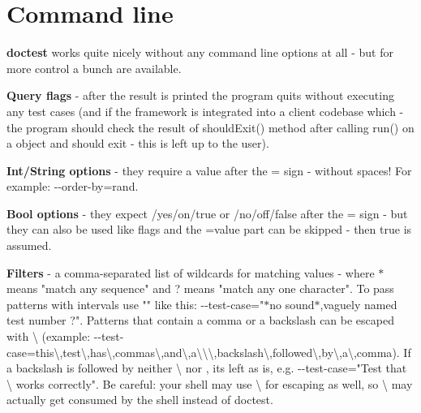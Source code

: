 \chapter{Command line}
\hypertarget{md_doctest_2doc_2markdown_2commandline}{}\label{md_doctest_2doc_2markdown_2commandline}
\label{md_doctest_2doc_2markdown_2commandline_autotoc_md76}%
%


{\bfseries{doctest}} works quite nicely without any command line options at all -\/ but for more control a bunch are available.

{\bfseries{Query flags}} -\/ after the result is printed the program quits without executing any test cases (and if the framework is integrated into a client codebase which  -\/ the program should check the result of {\ttfamily should\+Exit()} method after calling {\ttfamily run()} on a {\ttfamily {}} object and should exit -\/ this is left up to the user).

{\bfseries{Int/\+String options}} -\/ they require a value after the {\ttfamily =} sign -\/ without spaces! For example\+: {\ttfamily -\/-\/order-\/by=rand}.

{\bfseries{Bool options}} -\/ they expect {}/{\ttfamily yes}/{\ttfamily on}/{\ttfamily true} or {}/{\ttfamily no}/{\ttfamily off}/{\ttfamily false} after the {\ttfamily =} sign -\/ but they can also be used like flags and the {\ttfamily =value} part can be skipped -\/ then {\ttfamily true} is assumed. ~\newline


{\bfseries{Filters}} -\/ a comma-\/separated list of wildcards for matching values -\/ where {\ttfamily \texorpdfstring{$\ast$}{*}} means "{}match any sequence"{} and {\ttfamily ?} means "{}match any one character"{}. To pass patterns with intervals use {\ttfamily "{}"{}} like this\+: {\ttfamily -\/-\/test-\/case="{}\texorpdfstring{$\ast$}{*}no sound\texorpdfstring{$\ast$}{*},vaguely named test number ?"{}}. Patterns that contain a comma or a backslash can be escaped with {\ttfamily \textbackslash{}} (example\+: {\ttfamily -\/-\/test-\/case=this\textbackslash{},test\textbackslash{},has\textbackslash{},commas\textbackslash{},and\textbackslash{},a\textbackslash{}\textbackslash{}\textbackslash{},backslash\textbackslash{},followed\textbackslash{},by\textbackslash{},a\textbackslash{},comma}). If a backslash is followed by neither {\ttfamily \textbackslash{}} nor {\ttfamily ,} it\textquotesingle{}s left as is, e.\+g. {\ttfamily -\/-\/test-\/case="{}\+Test that \textbackslash{} works correctly"{}}. Be careful\+: your shell may use {\ttfamily \textbackslash{}} for escaping as well, so {\ttfamily \textbackslash{}} may actually get consumed by the shell instead of doctest.


